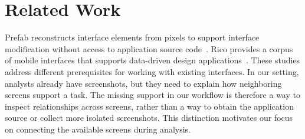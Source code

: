 \section{Related Work}\label{sec:rw}
Prefab reconstructs interface elements from pixels to support interface modification without access to application source code~\cite{dixon2010prefab}. Rico provides a corpus of mobile interfaces that supports data-driven design applications~\cite{deka2017rico}. These studies address different prerequisites for working with existing interfaces. In our setting, analysts already have screenshots, but they need to explain how neighboring screens support a task. The missing support in our workflow is therefore a way to inspect relationships across screens, rather than a way to obtain the application source or collect more isolated screenshots. This distinction motivates our focus on connecting the available screens during analysis.
